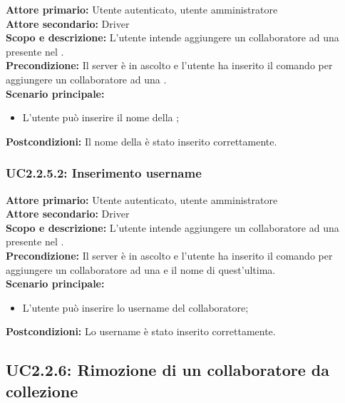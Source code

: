\documentclass{scalatekids-article}
\begin{document}
\textbf{Attore primario:} Utente autenticato, utente amministratore\\
\textbf{Attore secondario:} Driver\\
\textbf{Scopo e descrizione:} L’utente intende aggiungere un collaboratore ad una  presente nel .\\
\textbf{Precondizione:} Il server è in ascolto e l’utente ha inserito il comando per aggiungere un collaboratore ad una .\\
\textbf{Scenario principale:}
\begin{itemize}
\item L'utente può inserire il nome della ;
\end{itemize}
\textbf{Postcondizioni:} Il nome della  è stato inserito correttamente.

\subsubsection{UC2.2.5.2: Inserimento username}

\textbf{Attore primario:} Utente autenticato, utente amministratore\\
\textbf{Attore secondario:} Driver\\
\textbf{Scopo e descrizione:} L’utente intende aggiungere un collaboratore ad una  presente nel .\\
\textbf{Precondizione:} Il server è in ascolto e l’utente ha inserito il comando per aggiungere un collaboratore ad una  e il nome di quest'ultima.\\
\textbf{Scenario principale:}
\begin{itemize}
\item L'utente può inserire lo username del collaboratore;
\end{itemize}
\textbf{Postcondizioni:} Lo username è stato inserito correttamente.

\subsection{UC2.2.6: Rimozione di un collaboratore da collezione}
\end{document}
